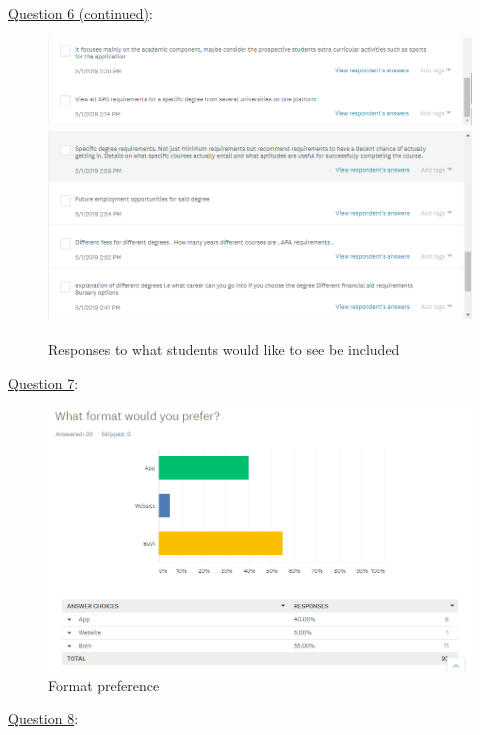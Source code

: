 \documentclass[a4paper, 12pt]{article}
\begin{document}
\newpage
\underline{Question 6 (continued)}:

\begin{figure}[h]
\centering
\includegraphics[width=\linewidth]{Q6_3}
\includegraphics[width=\linewidth]{Q6_4}
\caption{Responses to what students would like to see be included}
\label{fig:5}
\end{figure}

\newpage
\underline{Question 7}:

\begin{figure}[h]
\centering
\includegraphics[scale=0.6]{Q7}
\caption{Format preference}
\label{fig:6}
\end{figure}

\newpage
\underline{Question 8}:
\end{document}
